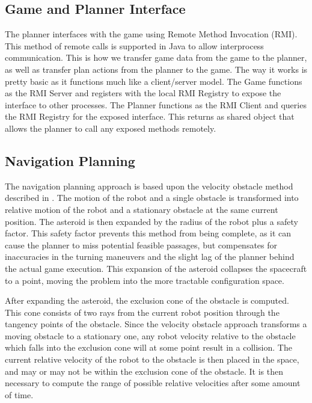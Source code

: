 \documentclass[10pt,final,conference]{article}
\begin{document}
\subsection{Game and Planner Interface}
The planner interfaces with the game using Remote Method Invocation (RMI).  This method of remote calls is supported in Java to allow interprocess communication.  This is how we transfer game data from the game to the planner, as well as transfer plan actions from the planner to the game.  The way it works is pretty basic as it functions much like a client/server model.  The Game functions as the RMI Server and registers with the local RMI Registry to expose the interface to other processes.  The Planner functions as the RMI Client and queries the RMI Registry for the exposed interface.  This returns as shared object that allows the planner to call any exposed methods remotely.

\subsection{Navigation Planning}

The navigation planning approach is based upon the velocity obstacle method described in \cite{fiorini1998motion}. The motion of the robot and a single obstacle is transformed into relative motion of the robot and a stationary obstacle at the same current position. The asteroid is then expanded by the radius of the robot plus a safety factor. This safety factor prevents this method from being complete, as it can cause the planner to miss potential feasible passages, but compensates for inaccuracies in the turning maneuvers and the slight lag of the planner behind the actual game execution. This expansion of the asteroid collapses the spacecraft to a point, moving the problem into the more tractable configuration space. 

After expanding the asteroid, the exclusion cone of the obstacle is computed. This cone consists of two rays from the current robot position through the tangency points of the obstacle. Since the velocity obstacle approach transforms a moving obstacle to a stationary one, any robot velocity relative to the obstacle which falls into the exclusion cone will at some point result in a collision. The current relative velocity of the robot to the obstacle is then placed in the space, and may or may not be within the exclusion cone of the obstacle. It is then necessary to compute the range of possible relative velocities after some amount of time.
\end{document}
